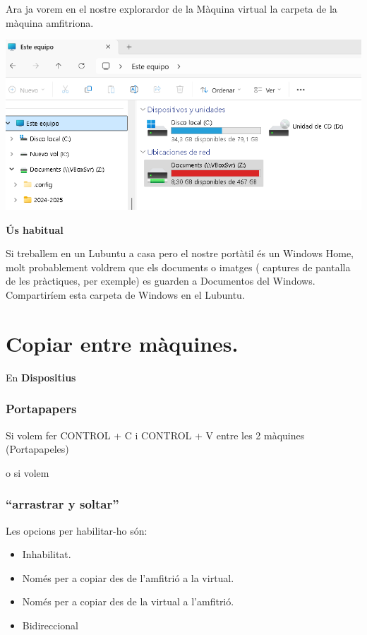 \documentclass[
  12 pt,
  a4paper,
]{article}
\providecommand{\tightlist}{%
  \setlength{\itemsep}{0pt}\setlength{\parskip}{0pt}}
\begin{document}
Ara ja vorem en el nostre explorardor de la Màquina virtual la carpeta
de la màquina amfitriona.

\includegraphics{png/explorador.png}

\textbf{Ús habitual}

Si treballem en un Lubuntu a casa pero el nostre portàtil és un Windows
Home, molt probablement voldrem que els documents o imatges ( captures
de pantalla de les pràctiques, per exemple) es guarden a Documentos del
Windows. Compartiríem esta carpeta de Windows en el Lubuntu.

\section{Copiar entre màquines.}\label{copiar-entre-muxe0quines.}

En \textbf{Dispositius}

\subsubsection{Portapapers}\label{portapapers}

Si volem fer CONTROL + C i CONTROL + V entre les 2 màquines
(Portapapeles)

o si volem

\subsubsection{``arrastrar y soltar''}\label{arrastrar-y-soltar}

Les opcions per habilitar-ho són:

\begin{itemize}
\tightlist
\item
  Inhabilitat.
\item
  Només per a copiar des de l'amfitrió a la virtual.
\item
  Només per a copiar des de la virtual a l'amfitrió.
\item
  Bidireccional
\end{itemize}
\end{document}
